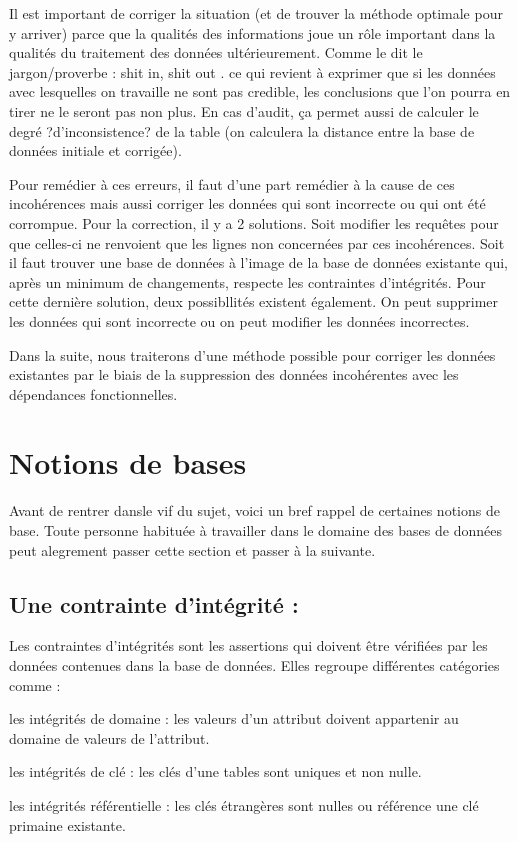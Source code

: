 \documentclass[12pt, a4paper, oneside, titlepage]{book}%
\begin{document}
Il est important de corriger la situation (et de trouver la méthode optimale pour y arriver) parce que la qualités des informations joue un rôle important dans la qualités du traitement des données ultérieurement. Comme le dit le jargon/proverbe : \og shit in, shit out \fg. ce qui revient à exprimer que si les données avec lesquelles on travaille ne sont pas credible, les conclusions que l'on pourra en tirer ne le seront pas non plus. En cas d'audit, ça permet aussi de calculer le degré ?d'inconsistence? de la table (on calculera la distance entre la base de données initiale et corrigée). 

Pour remédier à ces erreurs, il faut d'une part remédier à la cause de ces incohérences mais aussi corriger les données qui sont incorrecte ou qui ont été corrompue. Pour la correction, il y a 2 solutions. Soit modifier les requêtes pour que celles-ci ne renvoient que les lignes non concernées par ces incohérences. Soit il faut trouver une base de données à l’image de la base de données existante qui, après un minimum de changements, respecte les contraintes d’intégrités. Pour cette dernière solution, deux possibllités existent également. On peut supprimer les données qui sont incorrecte ou on peut modifier les données incorrectes.

Dans la suite, nous traiterons d'une méthode possible pour corriger les données existantes par le biais de la suppression des données incohérentes avec les dépendances fonctionnelles.



\clearpage

\section{Notions de bases}\label{SECbase}
Avant de rentrer dansle vif du sujet, voici un bref rappel de certaines notions de base. Toute personne habituée à travailler dans le domaine des bases de données peut alegrement passer cette section et passer à la suivante.


\subsection{Une contrainte d'intégrité : } 
Les contraintes d'intégrités sont les assertions qui doivent être vérifiées par les données contenues dans la base de données. Elles regroupe différentes catégories comme : 
\begin{description}
\item {les intégrités de domaine :} les valeurs d'un attribut doivent appartenir au domaine de valeurs de l'attribut.
\item {les intégrités de clé :} les clés d'une tables sont uniques et non nulle.
\item {les intégrités référentielle :} les clés étrangères sont nulles ou référence une clé primaine existante.
\end{description}
\end{document}
